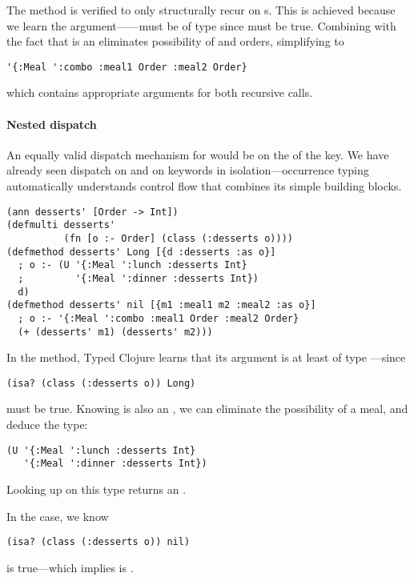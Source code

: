 The  method is verified to only structurally recur
on s. This is achieved because we learn the argument------must %
be of type
since
must be true. Combining 
with the fact that  is an 
eliminates possibility of  and 
orders, simplifying  to
\begin{verbatim}
'{:Meal ':combo :meal1 Order :meal2 Order}
\end{verbatim}
which contains appropriate arguments for both recursive calls.

\paragraph{Nested dispatch}
An equally valid dispatch mechanism for 
would be on the  of the  key.
We have already seen dispatch on  and on keywords
in isolation---occurrence typing automatically understands
control flow that combines its simple building blocks.

\begin{verbatim}
(ann desserts' [Order -> Int])
(defmulti desserts' 
          (fn [o :- Order] (class (:desserts o))))
(defmethod desserts' Long [{d :desserts :as o}] 
  ; o :- (U '{:Meal ':lunch :desserts Int}
  ;         '{:Meal ':dinner :desserts Int})
  d)
(defmethod desserts' nil [{m1 :meal1 m2 :meal2 :as o}]
  ; o :- '{:Meal ':combo :meal1 Order :meal2 Order}
  (+ (desserts' m1) (desserts' m2)))
\end{verbatim}
%

In the  method, Typed Clojure learns that
its argument is at least of type ---since
\begin{verbatim}
(isa? (class (:desserts o)) Long)
\end{verbatim}
must be true.
%
Knowing  is also an
, we can eliminate the possibility of
a  meal, and deduce the type:
\begin{verbatim}
(U '{:Meal ':lunch :desserts Int}
   '{:Meal ':dinner :desserts Int})
\end{verbatim}
Looking up  on this type returns an .

In the  case, we know
\begin{verbatim}
(isa? (class (:desserts o)) nil)
\end{verbatim}
is true---which implies  is .

